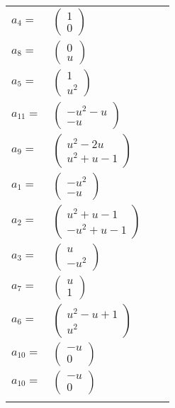 \documentclass[1p]{elsarticle_modified}
\theoremstyle{definition}
\begin{document}
\begin{tabular}{m{7pt} m{180pt} m{7pt} m{180pt} }
\flushright $a_{4}=$&$\begin{pmatrix}1\\0\end{pmatrix}$ \\
\flushright $a_{8}=$&$\begin{pmatrix}0\\u\end{pmatrix}$ \\
\flushright $a_{5}=$&$\begin{pmatrix}1\\u^2\end{pmatrix}$ \\
\flushright $a_{11}=$&$\begin{pmatrix}- u^2- u\\- u\end{pmatrix}$ \\
\flushright $a_{9}=$&$\begin{pmatrix}u^2-2 u\\u^2+u-1\end{pmatrix}$ \\
\flushright $a_{1}=$&$\begin{pmatrix}- u^2\\- u\end{pmatrix}$ \\
\flushright $a_{2}=$&$\begin{pmatrix}u^2+u-1\\- u^2+u-1\end{pmatrix}$ \\
\flushright $a_{3}=$&$\begin{pmatrix}u\\- u^2\end{pmatrix}$ \\
\flushright $a_{7}=$&$\begin{pmatrix}u\\1\end{pmatrix}$ \\
\flushright $a_{6}=$&$\begin{pmatrix}u^2- u+1\\u^2\end{pmatrix}$ \\
\flushright $a_{10}=$&$\begin{pmatrix}- u\\0\end{pmatrix}$\\ \flushright $a_{10}=$&$\begin{pmatrix}- u\\0\end{pmatrix}$\\&\end{tabular}
\end{document}
